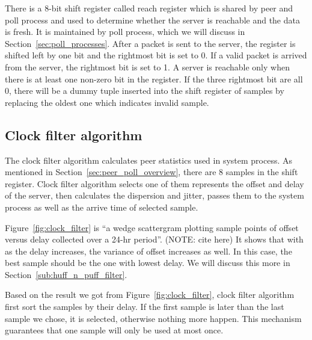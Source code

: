 There is a 8-bit shift register called reach register which is shared by peer
and poll process and used to determine whether the server is reachable and the
data is fresh. It is maintained by poll process, which we will discuss in
Section~\ref{sec:poll_processes}. After a packet is sent to the server, the
register is shifted left by one bit and the rightmost bit is set to 0. If a
valid packet is arrived from the server, the rightmost bit is set to 1. A
server is reachable only when there is at least one non-zero bit in the
register. If the three rightmost bit are all 0, there will be a dummy tuple
inserted into the shift register of samples by replacing the oldest one which
indicates invalid sample.

\subsection{Clock filter algorithm}%
\label{sub:clock_filter_algorithm}
The clock filter algorithm calculates peer statistics used in system process.
As mentioned in Section~\ref{sec:peer_poll_overview}, there are 8 samples in
the shift register. Clock filter algorithm selects one of them represents the
offset and delay of the server, then calculates the dispersion and jitter,
passes them to the system process as well as the arrive time of selected
sample.

Figure~\ref{fig:clock_filter} is ``a wedge scattergram plotting sample points of
offset versus delay collected over a 24-hr period''. (NOTE: cite here) It shows
that with as the delay increases, the variance of offset increases as well. In
this case, the best sample should be the one with lowest delay. We will discuss
this more in Section~\ref{sub:huff_n_puff_filter}.



Based on the result we got from Figure~\ref{fig:clock_filter}, clock filter
algorithm first sort the samples by their delay. If the first sample is later
than the last sample we chose, it is selected, otherwise nothing more happen.
This mechanism guarantees that one sample will only be used at most once.

